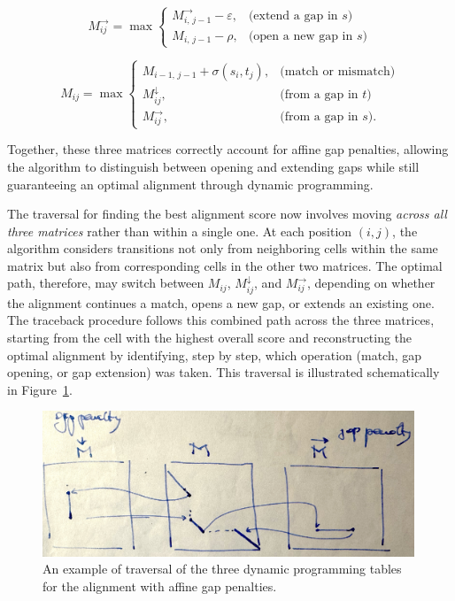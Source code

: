 \[
M_{ij}^\rightarrow = \max
\begin{cases}
M_{i,\,j-1}^\rightarrow - \varepsilon, & \text{(extend a gap in $s$)}\\[4pt]
M_{i,\,j-1} - \rho, & \text{(open a new gap in $s$)}
\end{cases}
\]

\[
M_{ij} = \max
\begin{cases}
M_{i-1,\,j-1} + \sigma(s_i, t_j), & \text{(match or mismatch)}\\[4pt]
M_{ij}^\downarrow, & \text{(from a gap in $t$)}\\[4pt]
M_{ij}^\rightarrow, & \text{(from a gap in $s$)}.
\end{cases}
\]

Together, these three matrices correctly account for affine gap penalties, 
allowing the algorithm to distinguish between opening and extending gaps 
while still guaranteeing an optimal alignment through dynamic programming.

The traversal for finding the best alignment score now involves moving \emph{across all three matrices} rather than within a single one. At each position $(i,j)$, the algorithm considers transitions not only from neighboring cells within the same matrix but also from corresponding cells in the other two matrices. The optimal path, therefore, may switch between $M_{ij}$, $M_{ij}^\downarrow$, and $M_{ij}^\rightarrow$, depending on whether the alignment continues a match, opens a new gap, or extends an existing one.  The traceback procedure follows this combined path across the three matrices, starting from the cell with the highest overall score and reconstructing the optimal alignment by identifying, step by step, which operation (match, gap opening, or gap extension) was taken. This traversal is illustrated schematically in Figure~\ref{f:affine-gap-traversal}.

\begin{figure}[ht]
    \centering
    \includegraphics[width=0.99\textwidth]{figs/alignment/affine.jpg}
    \caption{An example of traversal of the three dynamic programming tables for the alignment with affine gap penalties.}
    \label{f:affine-gap-traversal}
\end{figure}

